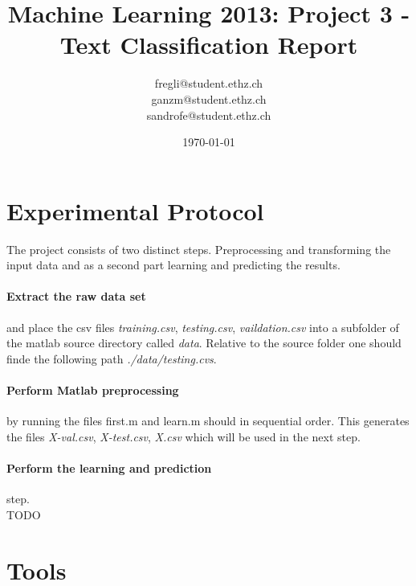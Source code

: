 \documentclass[a4paper, 11pt]{article}
\title{Machine Learning 2013: Project 3 - Text Classification Report}
\author{fregli@student.ethz.ch\\ ganzm@student.ethz.ch\\ sandrofe@student.ethz.ch\\}
\date{\today}
\begin{document}
\maketitle

\section*{Experimental Protocol}

The project consists of two distinct steps. Preprocessing and transforming the input data and as a second part learning and predicting the results.

\paragraph{Extract the raw data set} and place the csv files \textit{training.csv}, \textit{testing.csv}, \textit{vaildation.csv} into a subfolder of the matlab source directory called \textit{data}. Relative to the source folder one should finde the following path \textit{./data/testing.cvs}.

\paragraph{Perform Matlab preprocessing} by running the files first.m and learn.m should in sequential order. This generates the files \textit{X-val.csv}, \textit{X-test.csv}, \textit{X.csv} which will be used in the next step.

\paragraph{Perform the learning and prediction} step.\\

TODO



\section{Tools}
\end{document}
